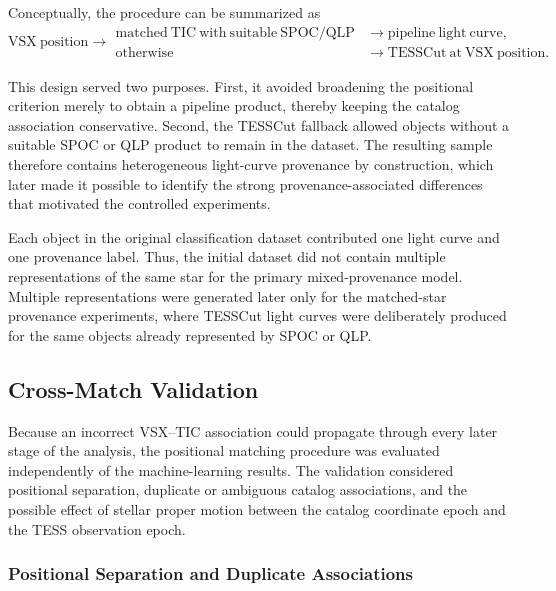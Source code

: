 \documentclass[linenumbers]{aastex701}
\begin{document}
Conceptually, the procedure can be summarized as
\begin{equation}
\mathrm{VSX\ position}
\rightarrow
\begin{array}{ll}
\mathrm{matched\ TIC\ with\ suitable\ SPOC/QLP} & \rightarrow \mathrm{pipeline\ light\ curve},\\
\mathrm{otherwise} & \rightarrow \mathrm{TESSCut\ at\ VSX\ position}.
\end{array}
\end{equation}

This design served two purposes. First, it avoided broadening the positional criterion merely to obtain a pipeline product, thereby keeping the catalog association conservative. Second, the TESSCut fallback allowed objects without a suitable SPOC or QLP product to remain in the dataset. The resulting sample therefore contains heterogeneous light-curve provenance by construction, which later made it possible to identify the strong provenance-associated differences that motivated the controlled experiments.

Each object in the original classification dataset contributed one light curve and one provenance label. Thus, the initial dataset did not contain multiple representations of the same star for the primary mixed-provenance model. Multiple representations were generated later only for the matched-star provenance experiments, where TESSCut light curves were deliberately produced for the same objects already represented by SPOC or QLP.


\subsection{Cross-Match Validation}
\label{subsec:match_validation}

Because an incorrect VSX--TIC association could propagate through every later stage of the analysis, the positional matching procedure was evaluated independently of the machine-learning results. The validation considered positional separation, duplicate or ambiguous catalog associations, and the possible effect of stellar proper motion between the catalog coordinate epoch and the TESS observation epoch.

\subsubsection{Positional Separation and Duplicate Associations}
\label{subsubsec:positional_validation}
\end{document}
